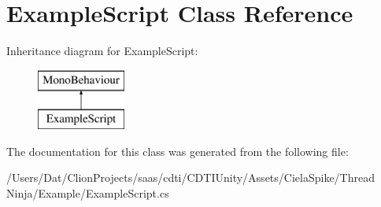 \hypertarget{class_example_script}{}\section{Example\+Script Class Reference}
\label{class_example_script}
Inheritance diagram for Example\+Script\+:\begin{figure}[H]
\begin{center}
\leavevmode
\includegraphics[height=2.000000cm]{class_example_script}
\end{center}
\end{figure}


The documentation for this class was generated from the following file\+:\begin{DoxyCompactItemize}
\item 
/\+Users/\+Dat/\+Clion\+Projects/saas/cdti/\+C\+D\+T\+I\+Unity/\+Assets/\+Ciela\+Spike/\+Thread Ninja/\+Example/Example\+Script.\+cs\end{DoxyCompactItemize}
